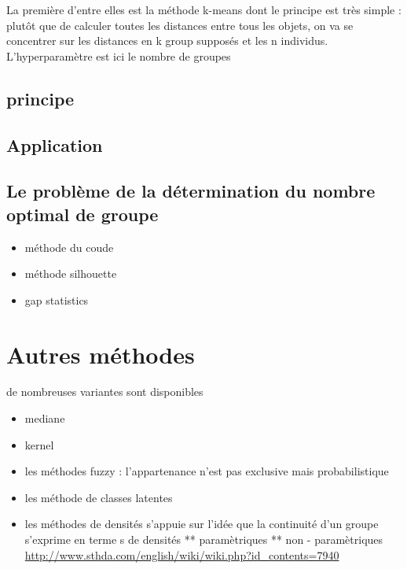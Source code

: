 \documentclass[
]{book}
\providecommand{\tightlist}{%
  \setlength{\itemsep}{0pt}\setlength{\parskip}{0pt}}
\begin{document}
La première d'entre elles est la méthode k-means dont le principe est très simple : plutôt que de calculer toutes les distances entre tous les objets, on va se concentrer sur les distances en k group supposés et les n individus. L'hyperparamètre est ici le nombre de groupes

\hypertarget{principe}{%
\subsection{principe}\label{principe}}

\hypertarget{application-1}{%
\subsection{Application}\label{application-1}}

\hypertarget{le-probluxe8me-de-la-duxe9termination-du-nombre-optimal-de-groupe}{%
\subsection{Le problème de la détermination du nombre optimal de groupe}\label{le-probluxe8me-de-la-duxe9termination-du-nombre-optimal-de-groupe}}

\begin{itemize}
\tightlist
\item
  méthode du coude
\item
  méthode silhouette
\item
  gap statistics
\end{itemize}

\hypertarget{autres-muxe9thodes}{%
\section{Autres méthodes}\label{autres-muxe9thodes}}

de nombreuses variantes sont disponibles

\begin{itemize}
\tightlist
\item
  mediane
\item
  kernel
\item
  les méthodes fuzzy : l'appartenance n'est pas exclusive mais probabilistique
\item
  les méthode de classes latentes
\item
  les méthodes de densités s'appuie sur l'idée que la continuité d'un groupe s'exprime en terme s de densités
  ** paramètriques
  ** non - paramètriques \url{http://www.sthda.com/english/wiki/wiki.php?id_contents=7940}
\end{itemize}
\end{document}
